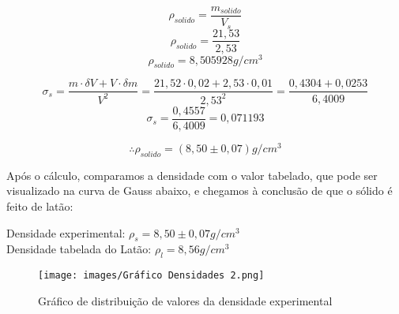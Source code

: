 \[\rho_{solido} = \frac{m_{solido}}{V_s} \]
\[\rho_{solido} = \frac{21,53}{2,53} \]
\[\rho_{solido} = 8,505928 g/cm^3 \]

\[ \sigma_s = \frac{m \cdot \delta V + V \cdot \delta m}{V^2} = \frac{21,52 \cdot 0,02 + 2,53 \cdot 0,01}{2,53^2} = \frac{0,4304 + 0,0253}{6,4009}\]
\[ \sigma_s = \frac{0,4557}{6,4009} = 0,071193\]

\[\therefore \rho_{solido} = (8,50 \pm 0,07) g/cm^3 \]

Após o cálculo, comparamos a densidade com o valor tabelado, que pode ser visualizado na curva de Gauss abaixo, e chegamos à conclusão de que o sólido é feito de latão:

Densidade experimental:  $\rho _s = 8,50 \pm 0,07 g/cm^3$\\

Densidade tabelada do Latão: $\rho_l = 8,56 g/cm^3$\\

\begin{figure}[H]
    \centering
    \texttt{[image: images/Gráfico Densidades 2.png]}
    \caption{Gráfico de distribuição de valores da densidade experimental }
\end{figure}